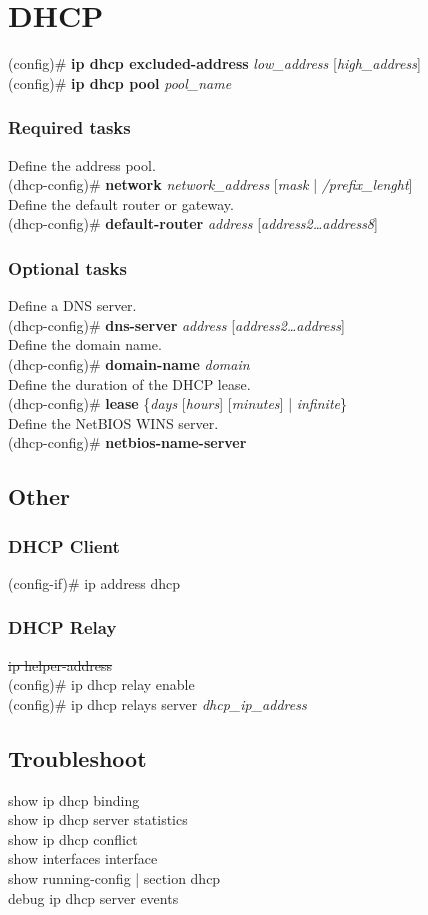 \section{DHCP}
(config)\# \textbf{ip dhcp excluded-address} \textit{low\_address} [\textit{high\_address}]\\
(config)\# \textbf{ip dhcp pool} \textit{pool\_name}
\subsubsection*{Required tasks}
\textrm{Define the address pool.}\\
(dhcp-config)\# \textbf{network} \textit{network\_address} [\textit{mask} | \textit{/prefix\_lenght}]\vspace{11pt}\\
\textrm{Define the default router or gateway.}\\
(dhcp-config)\# \textbf{default-router} \textit{address} [\textit{address2\dots address8}]
\subsubsection*{Optional tasks}
\textrm{Define a DNS server.}\\
(dhcp-config)\# \textbf{dns-server} \textit{address} [\textit{address2\dots address}]\vspace{11pt}\\
\textrm{Define the domain name.}\\
(dhcp-config)\# \textbf{domain-name} \textit{domain}\vspace{11pt}\\
\textrm{Define the duration of the DHCP lease.}\\
(dhcp-config)\# \textbf{lease} \{\textit{days} [\textit{hours}] [\textit{minutes}] | \textit{infinite}\}\vspace{11pt}\\
\textrm{Define the NetBIOS WINS server.}\\
(dhcp-config)\# \textbf{netbios-name-server}
\subsection{Other}
\subsubsection*{DHCP Client}
(config-if)\# ip address dhcp
\subsubsection*{DHCP Relay}
\sout{ip helper-address}\\
(config)\# ip dhcp relay enable\\
(config)\# ip dhcp relays server \textit{dhcp\_ip\_address}
\subsection{Troubleshoot}
show ip dhcp binding\\
show ip dhcp server statistics\\
show ip dhcp conflict\\
show interfaces interface\\
show running-config | section dhcp\\
debug ip dhcp server events
